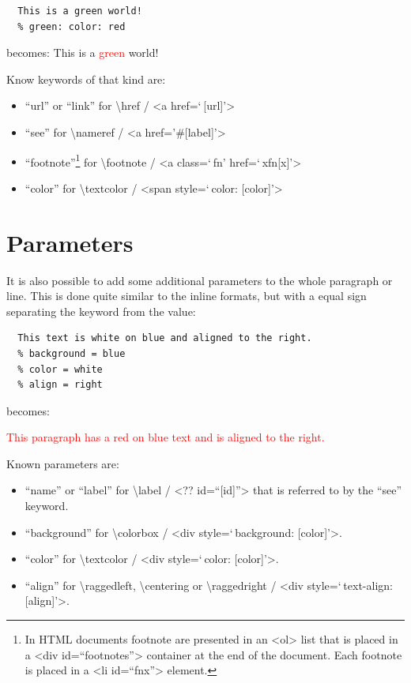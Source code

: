 \documentclass{article}
\begin{document}
\begin{verbatim}
  This is a green world!
  % green: color: red
\end{verbatim}


{becomes:
This is a \textcolor{red}{green} world!\\}

{Know keywords of that kind are:\\}

\begin{itemize}
\item “url” or “link” for \textbackslash href / <a href=‘ {[url]}’>
\item “see” for \textbackslash nameref / <a href='\#{[label]}’> 
\item “footnote”\footnote{In HTML documents footnote are presented in an <ol> list that is placed in a <div id=“footnotes”> container at the end of the document. Each footnote is placed in a <li id=“fnx”> element.}\xspace  for \textbackslash footnote / <a class=‘ fn’ href=‘ xfn{[x]}’>
\item “color” for \textbackslash textcolor / <span style=‘ color: {[color]}’>
\end{itemize}


\section{Parameters}

{It is also possible to add some additional parameters to the whole
paragraph or line. This is done quite similar to the inline
formats, but with a equal sign separating the keyword from
the value:\\}

\begin{verbatim}
  This text is white on blue and aligned to the right.
  % background = blue
  % color = white
  % align = right
\end{verbatim}


{becomes:\\}

\colorbox{PaleTurquoise1}{\parbox{\linewidth}{%
{\raggedleft%
\textcolor{red}{%
This paragraph has a red on blue text and is aligned to the
right.}\\}
}
}

{Known parameters are:\\}

\begin{itemize}
\item “name” or “label” for \textbackslash label / <?? id=“{[id]}”> that is
  referred to by the “see” keyword.
\item “background” for \textbackslash colorbox / <div style=‘ background: {[color]}’>.
\item “color” for \textbackslash textcolor / <div style=‘ color: {[color]}’>.
\item “align” for \textbackslash raggedleft, \textbackslash centering or \textbackslash raggedright / <div
  style=‘ text-align: {[align]}’>.
\end{itemize}
\end{document}

